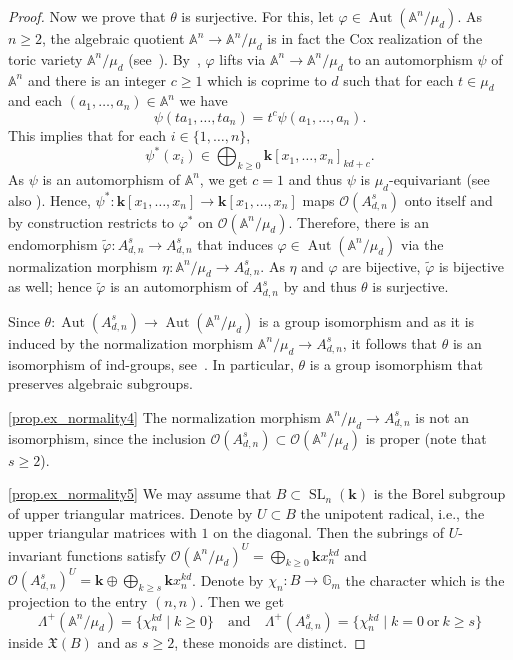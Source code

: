 \documentclass[11pt]{article}
\newcommand{\ie}{i.e.,\xspace}
\numberwithin{equation}{section}
\let\mathcal\mathscr
\theoremstyle{plain}
\theoremstyle{definition}
\DeclareMathOperator{\SL}{SL}
\DeclareMathOperator{\Aut}{Aut}
\newcommand{\OO}{\mathcal{O}}
\newcommand{\GG}{\mathbb{G}}
\renewcommand{\AA}{\mathbb{A}}
\newcommand{\kk}{{\boldsymbol{k}}}
\newcommand{\set}[2]{\{#1 \mid #2\}}
\begin{document}
\begin{proof}
Now we prove that $\theta$ is surjective. For this, let $\varphi \in \Aut(\AA^n / \mu_d)$.
As $n \geq 2$,
the algebraic quotient $\AA^n \to \AA^n/\mu_d$ is in fact the Cox realization of the toric variety
$\AA^n/\mu_d$ (see~\cite[Th.\,3.1]{ArGa2010Cox-rings-semigrou}).
By~\cite[Cor.\,2.5, Lem.\,4.2]{Be2003Lifting-of-morphis},
$\varphi$ lifts via $\AA^n \to \AA^n / \mu_d$ to an automorphism $\psi$ of $\AA^n$
and there is an integer $c \geq 1$ which is coprime to $d$ such that for each $t \in \mu_d$
and each $(a_1, \ldots, a_n) \in \AA^n$ we have
\[
\psi(t a_1, \ldots, t a_n) = t^c \psi(a_1, \ldots, a_n).
\]
This implies that for each $i \in \{1, \ldots, n\}$,
\[
\psi^\ast(x_i) \in \bigoplus_{k\geq0} \kk[x_1,\dots,x_n]_{kd+c}.
\]
As $\psi$ is an automorphism of $\AA^n$, we get $c = 1$ and thus
$\psi$ is $\mu_d$-equivariant (see also \cite[Prop.\,4]{Re2017Characterization-o}).
Hence, $\psi^\ast \colon \kk[x_1, \ldots,x_n] \to \kk[x_1, \ldots, x_n]$ maps
$\OO(A_{d, n}^s)$ onto itself and by construction restricts to $\varphi^\ast$ on $\OO(\AA^n / \mu_d)$.
Therefore, there is an endomorphism $\tilde{\varphi} \colon A_{d, n}^s \to A_{d, n}^s$
that induces $\varphi \in \Aut(\AA^n / \mu_d)$
via the normalization morphism $\eta \colon \AA^n / \mu_d \to A_{d, n}^s$.
As $\eta$ and $\varphi$ are bijective,
$\tilde{\varphi}$ is bijective as well;
hence $\tilde{\varphi}$ is an automorphism of $A_{d, n}^s$ by \cite[Lem.\,1]{Ka2005On-a-theorem-of-Ax} and thus $\theta$ is surjective.

Since $\theta \colon \Aut(A_{d, n}^s) \to \Aut(\AA^n / \mu_d)$ is a group isomorphism
and as it is induced by the normalization morphism $\AA^n / \mu_d \to A_{d, n}^s$, it follows that $\theta$
is an isomorphism of ind-groups, see~\cite[Prop.\,12.1.1]{FuKr2018On-the-geometry-of}. In particular, $\theta$ is a group isomorphism that
preserves algebraic subgroups.

\eqref{prop.ex_normality4}
The normalization morphism $\AA^n / \mu_d \to A_{d, n}^s$ is
not an isomorphism, since the inclusion $\OO(A_{d, n}^s) \subset \OO(\AA^n / \mu_d)$ is proper
(note that $s \geq 2$).

\eqref{prop.ex_normality5}
We may assume that $B \subset \SL_n(\kk)$ is the Borel subgroup of upper triangular matrices.
Denote by $U \subset B$ the unipotent radical, \ie the upper triangular matrices with $1$ on the diagonal.
Then the subrings of $U$-invariant functions satisfy
$\OO(\AA^n / \mu_d)^U = \bigoplus_{k \geq 0} \kk x_n^{kd}$ and
$\OO(A_{d, n}^s)^U = \kk \oplus \bigoplus_{k \geq s} \kk x_n^{kd}$. Denote by
$\chi_n \colon B \to \GG_m$ the character which is the projection to the entry $(n, n)$.
Then we get
\[
\Lambda^+(\AA^n / \mu_d) = \set{\chi_n^{kd}}{k \geq 0} \quad \textrm{and} \quad
\Lambda^+(A_{d, n}^s) = \set{\chi_n^{kd}}{k = 0 \ \textrm{or} \ k \geq s}
\]
inside $\mathfrak{X}(B)$ and as $s \geq 2$, these monoids are distinct.
\end{proof}
\end{document}
